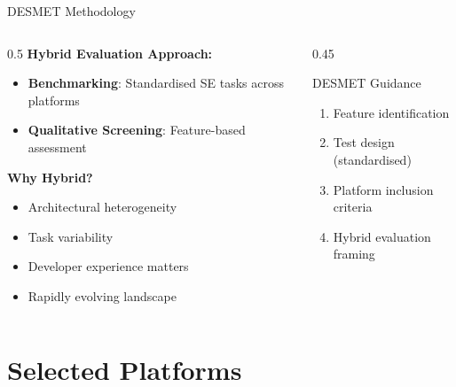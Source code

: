 \documentclass[aspectratio=169]{beamer}
\begin{document}
\begin{frame}{DESMET Methodology}
    \begin{columns}
        \begin{column}{0.5\textwidth}
            \textbf{Hybrid Evaluation Approach:}
            \begin{itemize}
                \item \textbf{Benchmarking}: Standardised SE tasks across platforms
                \item \textbf{Qualitative Screening}: Feature-based assessment
            \end{itemize}

            \vspace{0.3cm}
            \textbf{Why Hybrid?}
            \begin{itemize}
                \item Architectural heterogeneity
                \item Task variability
                \item Developer experience matters
                \item Rapidly evolving landscape
            \end{itemize}
        \end{column}
        \begin{column}{0.45\textwidth}
            \begin{block}{DESMET Guidance}
                \small
                \begin{enumerate}
                    \item Feature identification
                    \item Test design (standardised)
                    \item Platform inclusion criteria
                    \item Hybrid evaluation framing
                \end{enumerate}
            \end{block}
        \end{column}
    \end{columns}
\end{frame}

\section{Selected Platforms}
\end{document}
